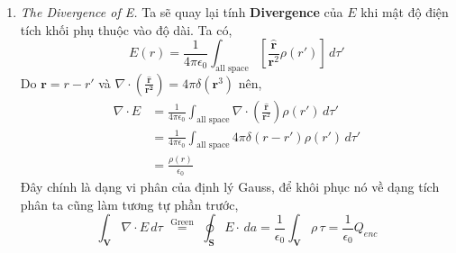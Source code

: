 \begin{enumerate}
\[\]
Từ đó ta tính được:
\[
\Phi_{\mathbf{E}} = \oint_{S} \mathbf{E}\ \cdot \, d\mathbf{a}=\oint_{S} \Sigma{\mathbf{E_{i}}} \cdot \, d\mathbf{a}=\Sigma \oint_{S} \mathbf{E_{i}}\ \cdot \, d\mathbf{a}=\Sigma \frac{q_{i}}{\epsilon_{0}}=\frac{Q_{enc}}{\epsilon_{0}}
\]
Với $Q_{enc}$ là tổng điện tích điểm có trong vật, mà tổng điện tích có trong vật có thể tính bằng công thức:
\[
Q_{enc} = \oint_{v} \rho\, d\tau
\]
Theo định lý \textbf{Greeen} ta lại có:
\[
\oint_{v} \nabla \cdot E \, d\tau = \oint_{s} E \cdot\, d\mathbf{a} 
\]
Suy ra:
\[
\oint_{v} \nabla \cdot E \, d\tau = \oint_{S} E \cdot\, d\mathbf{a} = \frac{Q_{enc}}{\epsilon_{0}}= \oint_{v} \frac{\rho}{\epsilon_0} \, d\tau
\]
Vậy:
\[
\boxed{\nabla \cdot E =\frac{\rho}{\epsilon_{0}}}
\]
Với $\rho$ gọi là mật độ điện tích khối.\\ \\
\textbf{Chú ý !!} Ta ký hiệu gốc cực và gốc phương vị này hơi khác so với định nghĩa tọa độ cầu ở trên, với \textbf{góc cực} là $\mathbf{\phi}$ còn \textbf{góc phương vị} là $\theta$.

\item \textit{The Divergence of E.}
Ta sẽ quay lại tính \textbf{Divergence} của $E$ khi mật độ điện tích khối phụ thuộc vào độ dài. Ta có,
\[
E(r) = \frac{1}{4 \pi \epsilon_{0}} \int_{\text{all space}} [\frac{\hat{\mathbf{r}}}{\mathbf{r}^2}\rho(r')] \, d\tau'
\]
Do $\mathbf{r} = r - r'$ và $\nabla \cdot (\frac{\mathbf{\hat{r}}}{\mathbf{r^2}}) = 4\pi\delta(\mathbf{r}^3)$ nên,
\begin{align*}
\nabla \cdot E &= \frac{1}{4 \pi \epsilon_{0}} \int_{\text{all space}} \nabla \cdot (\frac{\hat{\mathbf{r}}}{\mathbf{r}^2})\rho(r') \, d\tau'\\[6pt]
&=  \frac{1}{4 \pi \epsilon_{0}} \int_{\text{all space}} 4\pi \delta(r - r') \rho(r') \, d\tau'\\[6pt]
&= \frac{\rho(r)}{\epsilon_{0}}
\end{align*}
Đây chính là dạng vi phân của định lý Gauss, để khôi phục nó về dạng tích phân ta cũng làm tương tự phần trước,
\[
\int_{\mathbf{V}} \nabla \cdot E \, d \tau \,\, \overset{\text{Green}}{=} \,\, \oint_{\mathbf{S}} E \cdot \, da = \frac{1}{\epsilon_{0}}\int_{\mathbf{V}} \rho \, \tau = \frac{1}{\epsilon_{0}} Q_{enc}
\]




\end{enumerate}
